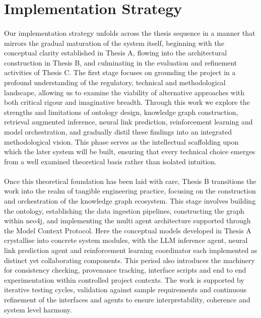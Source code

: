     \newpage
    \section{Implementation Strategy}

        \paragraph{}
        Our implementation strategy unfolds across the thesis sequence in a manner that mirrors the gradual maturation of the system itself, beginning with the conceptual clarity established in Thesis A, flowing into the architectural construction in Thesis B, and culminating in the evaluation and refinement activities of Thesis C. The first stage focuses on grounding the project in a profound understanding of the regulatory, technical and methodological landscape, allowing us to examine the viability of alternative approaches with both critical rigour and imaginative breadth. Through this work we explore the strengths and limitations of ontology design, knowledge graph construction, retrieval augmented inference, neural link prediction, reinforcement learning and model orchestration, and gradually distil these findings into an integrated methodological vision. This phase serves as the intellectual scaffolding upon which the later system will be built, ensuring that every technical choice emerges from a well examined theoretical basis rather than isolated intuition.

        \paragraph{}
        Once this theoretical foundation has been laid with care, Thesis B transitions the work into the realm of tangible engineering practice, focusing on the construction and orchestration of the knowledge graph ecosystem. This stage involves building the ontology, establishing the data ingestion pipelines, constructing the graph within neo4j, and implementing the multi agent architecture supported through the Model Context Protocol. Here the conceptual models developed in Thesis A crystallise into concrete system modules, with the LLM inference agent, neural link prediction agent and reinforcement learning coordinator each implemented as distinct yet collaborating components. This period also introduces the machinery for consistency checking, provenance tracking, interface scripts and end to end experimentation within controlled project contexts. The work is supported by iterative testing cycles, validation against sample requirements and continuous refinement of the interfaces and agents to ensure interpretability, coherence and system level harmony.

